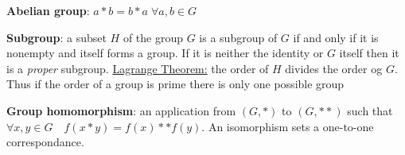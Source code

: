 \begin{squishlist}
    \item \textbf{Abelian group}: $a * b = b * a \; \forall a,b \in G$
    \item \textbf{Subgroup}: a subset $H$ of the group $G$ is a subgroup of $G$ if and only if it
    is nonempty and itself forms a group. If it is neither the identity or $G$ itself then it is a \emph{proper} subgroup. \underline{Lagrange Theorem:} the order of $H$ divides the order og $G$. Thus if the order of a group is prime there is only one possible group

    \item \textbf{Group homomorphism}: an application from $(G, *)$ to $(G, **)$ such that $\forall x,y \in G \quad f(x * y) = f(x) ** f(y)$. An isomorphism sets a one-to-one correspondance.
    
\end{squishlist}

